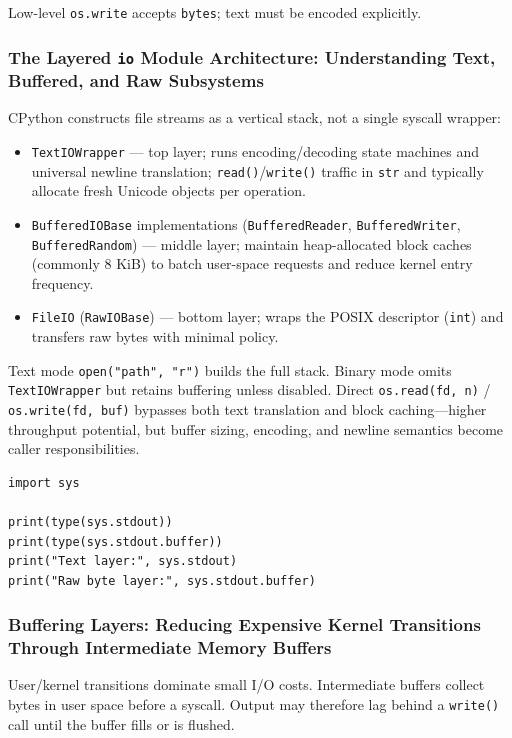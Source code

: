 Low-level \texttt{os.write} accepts \texttt{bytes}; text must be encoded explicitly.

\subsubsection{The Layered \texttt{io} Module Architecture: Understanding Text, Buffered, and Raw Subsystems}

CPython constructs file streams as a vertical stack, not a single syscall wrapper:

\begin{itemize}
    \item \texttt{TextIOWrapper} --- top layer; runs encoding/decoding state machines and universal newline translation; \texttt{read()}/\texttt{write()} traffic in \texttt{str} and typically allocate fresh Unicode objects per operation.
    \item \texttt{BufferedIOBase} implementations (\texttt{BufferedReader}, \texttt{BufferedWriter}, \texttt{BufferedRandom}) --- middle layer; maintain heap-allocated block caches (commonly 8 KiB) to batch user-space requests and reduce kernel entry frequency.
    \item \texttt{FileIO} (\texttt{RawIOBase}) --- bottom layer; wraps the POSIX descriptor (\texttt{int}) and transfers raw bytes with minimal policy.
\end{itemize}

Text mode \texttt{open("path", "r")} builds the full stack. Binary mode omits \texttt{TextIOWrapper} but retains buffering unless disabled. Direct \texttt{os.read(fd, n)} / \texttt{os.write(fd, buf)} bypasses both text translation and block caching---higher throughput potential, but buffer sizing, encoding, and newline semantics become caller responsibilities.

\begin{verbatim}
import sys

print(type(sys.stdout))
print(type(sys.stdout.buffer))
print("Text layer:", sys.stdout)
print("Raw byte layer:", sys.stdout.buffer)
\end{verbatim}

\subsubsection{Buffering Layers: Reducing Expensive Kernel Transitions Through Intermediate Memory Buffers}

User/kernel transitions dominate small I/O costs. Intermediate buffers collect bytes in user space before a syscall. Output may therefore lag behind a \texttt{write()} call until the buffer fills or is flushed.
